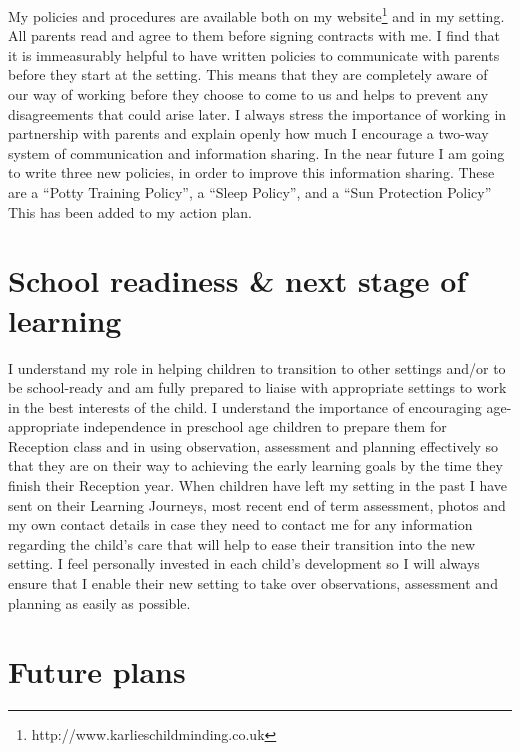 \documentclass[10pt,a4paper]{report}
\begin{document}
My policies and procedures are available both on my website\footnote{http://www.karlieschildminding.co.uk} and in my setting. All parents read and agree to them before signing contracts with me. I find that it is immeasurably helpful to have written policies to communicate with parents before they start at the setting. This means that they are completely aware of our way of working before they choose to come to us and helps to prevent any disagreements that could arise later. I always stress the importance of working in partnership with parents and explain openly how much I encourage a two-way system of communication and information sharing. In the near future I am going to write three new policies, in order to improve this information sharing. These are a “Potty Training Policy”, a “Sleep Policy”, and a “Sun Protection Policy” This has been added to my action plan. 

\section{School readiness \& next stage of learning}

I understand my role in helping children to transition to other settings and/or to be school-ready and am fully prepared to liaise with appropriate settings to work in the best interests of the child. I understand the importance of encouraging age-appropriate independence in preschool age children to prepare them for Reception class and in using observation, assessment and planning effectively so that they are on their way to achieving the early learning goals by the time they finish their Reception year. When children have left my setting in the past I have sent on their Learning Journeys, most recent end of term assessment, photos and my own contact details in case they need to contact me for any information regarding the child's care that will help to ease their transition into the new setting. I feel personally invested in each child's development so I will always ensure that I enable their new setting to take over observations, assessment and planning as easily as possible.

\section{Future plans}
\end{document}
